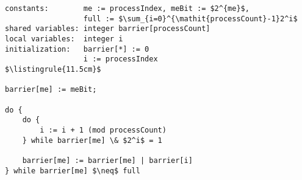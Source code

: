 \begin{center}
\begin{minipage}{\textwidth}
\begin{lstlisting}[mathescape, linewidth=11.5cm]
constants:        me := processIndex, meBit := $2^{me}$,
                  full := $\sum_{i=0}^{\mathit{processCount}-1}2^i$
shared variables: integer barrier[processCount]
local variables:  integer i
initialization:   barrier[*] := 0
                  i := processIndex
$\listingrule{11.5cm}$

barrier[me] := meBit;

do {
	do {
		i := i + 1 (mod processCount)
	} while barrier[me] \& $2^i$ = 1

	barrier[me] := barrier[me] | barrier[i]
} while barrier[me] $\neq$ full
\end{lstlisting}
\end{minipage}
\end{center}
